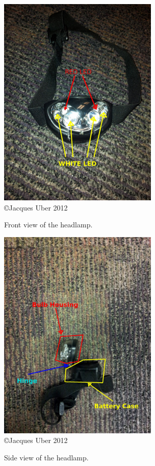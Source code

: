\documentclass[12pt]{article}
\begin{document}
\begin{figure}[h!]
\centering
\label{Figure Derp}
\caption[Front view of the headlamp] {Front view of the headlamp.}
\includegraphics[width=3in]{headlamp}
\\ {\tiny \copyright  Jacques Uber 2012}
\end{figure}

\begin{figure}[h!]
\centering
\caption[Side view of the headlamp] {Side view of the headlamp.}
\includegraphics[width=3in]{headlamp_side}
\\ {\tiny \copyright  Jacques Uber 2012}
\end{figure}
\end{document}
